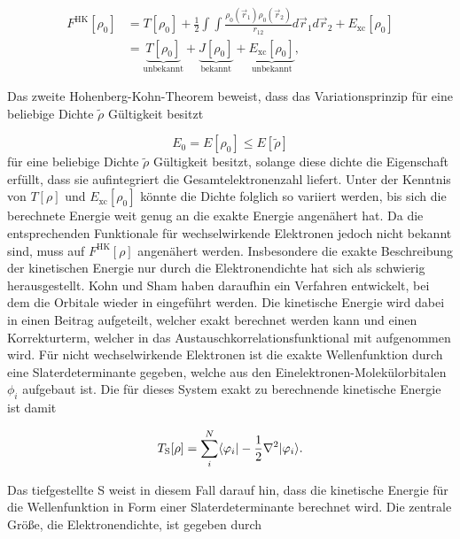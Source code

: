\begin{equation}
\begin{aligned}
	F^{\textrm{HK}}[\rho_0]&=T[\rho_0]+\frac{1}{2}\int\int \frac{\rho_0(\vec{r}_1)\rho_0(\vec{r}_2)}{r_{12}}d\vec{r}_1d\vec{r}_2+E_{\textrm{xc}}[\rho_0]\\
	&= \underbrace{T[\rho_0]}_{\textrm{unbekannt}} + \underbrace{J[\rho_0]}_{\textrm{bekannt}} + \underbrace{E_{\textrm{xc}}[\rho_0]}_{\textrm{unbekannt}},
\end{aligned}
\end{equation}

Das zweite Hohenberg-Kohn-Theorem beweist, dass das Variationsprinzip für eine beliebige Dichte $\tilde{\rho}$ Gültigkeit besitzt

\begin{equation}
	E_{0}=E[\rho_{0}] \le E[\tilde\rho]
\end{equation}
für eine beliebige Dichte $\tilde{\rho}$ Gültigkeit besitzt, solange diese dichte die Eigenschaft erfüllt, dass sie aufintegriert die Gesamtelektronenzahl liefert. Unter der Kenntnis von $T[\rho]$ und $E_{\textrm{xc}}[\rho_0]$ könnte die Dichte folglich so variiert werden, bis sich die berechnete Energie weit genug an die exakte Energie angenähert hat. Da die entsprechenden Funktionale für wechselwirkende Elektronen jedoch nicht bekannt sind, muss auf $F^{\textrm{HK}}[\rho]$ angenähert werden. Insbesondere die exakte Beschreibung der kinetischen Energie nur durch die Elektronendichte hat sich als schwierig herausgestellt. Kohn und Sham\supercite{kohn1965self} haben daraufhin ein Verfahren entwickelt, bei dem die Orbitale wieder in eingeführt werden. Die kinetische Energie wird dabei in einen Beitrag aufgeteilt, welcher exakt berechnet werden kann und einen Korrekturterm, welcher in das Austauschkorrelationsfunktional mit aufgenommen wird. Für nicht wechselwirkende Elektronen ist die exakte Wellenfunktion durch eine Slaterdeterminante gegeben, welche aus den Einelektronen-Molekülorbitalen $\phi_i$ aufgebaut ist. Die für dieses System exakt zu berechnende kinetische Energie ist damit

\begin{equation}
T_{\textrm S}[\rho] = \sum_i^N\langle\varphi_i|-\frac{1}{2}\nabla^2|\varphi_i\rangle.
\label{kinenergie}
\end{equation}

Das tiefgestellte S weist in diesem Fall darauf hin, dass die kinetische Energie für die Wellenfunktion in Form einer Slaterdeterminante berechnet wird. Die zentrale Größe, die Elektronendichte, ist gegeben durch

